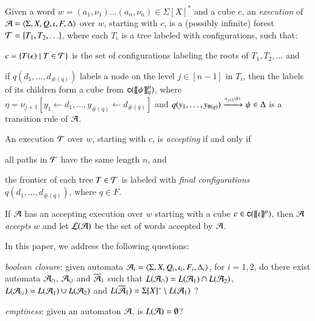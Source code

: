 \documentclass{llncs}
\begin{document}
\begin{definition}\label{def:execution}
Given a word $w=(a_1,\nu_1) \ldots (a_n,\nu_n) \in \Sigma[X]^*$ and a cube $c$, an
\emph{execution} of $\mathcal{A}=\langle \Sigma,X,Q,\iota,F,\Delta \rangle$ over $w$, starting with $c$, is
a (possibly infinite) forest $\mathcal{T} = \{ T_1,T_2,\ldots \}$, where each
$T_i$ is a tree labeled with configurations, such that:
\begin{compactenum}
\item\label{it1:execution} $c = \{ T(\epsilon) \mid T \in \mathcal{T} \}$ is the set of
  configurations labeling the roots of $T_1,T_2,\ldots$ and
%
\item\label{it2:execution} if $q(d_1,\ldots,d_{\#(q)})$ labels a node on the level $j \in
  [n-1]$ in $T_i$, then the labels of its children form a cube from
  $\mathsf{c}({{\bf [\![} \psi {\bf ]\!]}^\mu_{\eta}})$, where $\eta = \nu_{j+1}[y_1
    \leftarrow d_1,\ldots,y_{\#(q)} \leftarrow d_{\#(q)}]$ and
  \(q(y_1,\ldots,y_{\#(q)}) \xrightarrow{{\scriptscriptstyle a_{j+1}(X)}}_{{\scriptstyle }} \psi \in \Delta\) is
  a transition rule of $\mathcal{A}$.
\end{compactenum}
\end{definition}

\begin{definition}\label{def:accepting}
An execution $\mathcal{T}$ over $w$, starting with $c$, is \emph{accepting} if
and only if \begin{compactitem}
\item\label{it1:accepting} all paths in $\mathcal{T}$ have the same length $n$,
  and
\item\label{it2:accepting} the frontier of each tree $T \in \mathcal{T}$ is
  labeled with \emph{final configurations} $q(d_1,\ldots,d_{\#(q)})$,
  where $q \in F$.
\end{compactitem} 
If $\mathcal{A}$ has an accepting execution over $w$ starting with a cube $c
\in \mathsf{c}({{\bf [\![} \iota {\bf ]\!]}^\mu})$, then $\mathcal{A}$ \emph{accepts} $w$ and let
${\mathcal L}({\mathcal{A}})$ be the set of words accepted by $\mathcal{A}$.
\end{definition}
In this paper, we address the following questions: \begin{compactenum}
\item \emph{boolean closure}: given automata $\mathcal{A}_i =
  \langle \Sigma,X,Q_i,\iota_i,F_i,\Delta_i \rangle$, for $i=1,2$, do there
  exist automata $\mathcal{A}_\cap$, $\mathcal{A}_\cup$ and $\overline{\mathcal{A}}_1$ such that
  $L(\mathcal{A}_\cap) = L(\mathcal{A}_1) \cap L(\mathcal{A}_2)$, $L(\mathcal{A}_\cup) = L(\mathcal{A}_1) \cup
  L(\mathcal{A}_2)$ and $L(\overline{\mathcal{A}}_1) = \Sigma[X]^* \setminus L(\mathcal{A}_1)$ ?
%
\item \emph{emptiness}: given an automaton $\mathcal{A}$, is $L(\mathcal{A}) =
  \emptyset$?
\end{compactenum}
\end{document}
